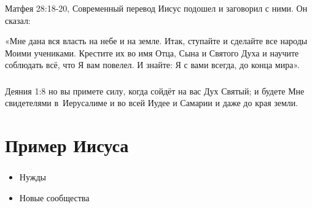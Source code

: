 \documentclass[t,aspectratio=169,14pt]{beamer}  %
\begin{document}
\begin{frame}
	\frametitle{\insertsection}

	\begin{block}{Матфея 28:18-20, Современный перевод}
		Иисус подошел и заговорил с ними. Он сказал:\vspace{0.3cm}
		
		«Мне дана вся власть на небе и на земле.\linebreak 
		Итак, \linebreak  \hphantom{aaa}ступайте \linebreak и \hphantom{a}сделайте все народы Моими учениками. \linebreak 
		\hphantom{aaa}Крестите их во имя Отца, Сына и Святого Духа \linebreak 
		и \hphantom{a}научите соблюдать всё, что Я вам повелел. \linebreak 
		И \hphantom{a}знайте: Я с вами всегда, до конца мира».
	\end{block}
\end{frame}
\begin{frame}
	\frametitle{\insertsection}

	\begin{block}{Деяния 1:8}
		но вы \linebreak 
		\hphantom{a} примете силу, \hphantom{M}когда сойдёт на вас Дух Святый;\linebreak 
		и будете Мне свидетелями \linebreak 
		\hphantom{MM} в~Иерусалиме \linebreak
		\hphantom{MM} и во всей Иудее \linebreak
		\hphantom{MM} и Самарии \linebreak
		\hphantom{MM} и даже до края земли.
	\end{block}
\end{frame} 
\section{Пример Иисуса}

\begin{frame}
	\frametitle{\insertsection}

\begin{itemize}
	\item Нужды
	\item Новые сообщества
\end{itemize}

\end{frame}
\end{document}
